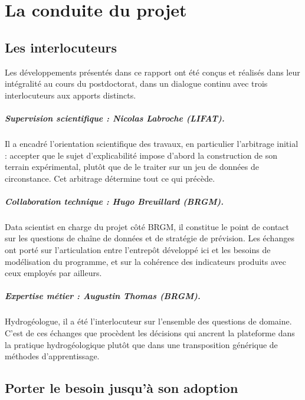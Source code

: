 \chapter{La conduite du projet}
\label{ch:conduite}


\section{Les interlocuteurs}

Les développements présentés dans ce rapport ont été conçus et réalisés dans leur intégralité au
cours du postdoctorat, dans un dialogue continu avec trois interlocuteurs aux apports distincts.

\paragraph{Supervision scientifique : Nicolas Labroche (LIFAT).} Il a encadré l'orientation
scientifique des travaux, en particulier l'arbitrage
initial : accepter que le sujet d'explicabilité impose d'abord la construction de son terrain
expérimental, plutôt que de le traiter sur un jeu de données de circonstance. Cet arbitrage
détermine tout ce qui précède.

\paragraph{Collaboration technique : Hugo Breuillard (BRGM).} Data scientist en charge du projet
côté BRGM, il constitue le point de contact sur les questions de chaîne de données et de
stratégie de prévision. Les échanges ont porté sur l'articulation entre l'entrepôt développé ici
et les besoins de modélisation du programme, et sur la cohérence des indicateurs produits avec
ceux employés par ailleurs.

\paragraph{Expertise métier : Augustin Thomas (BRGM).} Hydrogéologue, il a été l'interlocuteur
sur l'ensemble des questions de domaine. C'est de ces échanges que procèdent les décisions qui
ancrent la plateforme dans la pratique hydrogéologique plutôt que dans une transposition
générique de méthodes d'apprentissage.

\section{Porter le besoin jusqu'à son adoption}

